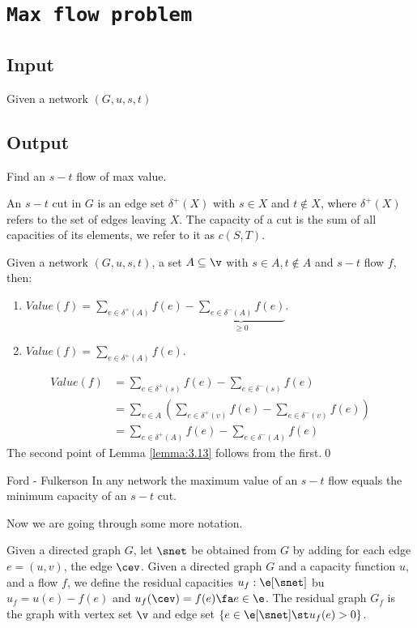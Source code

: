 \section{\texttt{Max flow problem}}
\subsection{Input}
Given a network $(G, u, s, t)$
\subsection{Output}
Find an $s - t$ flow of max value.

An $s - t$ cut in $G$ is an edge set $\delta^+(X)$ with $s \in X$ and $t \notin X$, where $\delta^+(X)$ refers to the set of edges leaving $X$. The capacity of a cut is the sum of all capacities of its elements, we refer to it as $c(S, T)$.
\begin{customlemma}{3.13}
\label{lemma:3.13}
    Given a network $(G, u, s, t)$, a set $A \subseteq \v$ with $s \in A, t \notin A$ and $s - t$ flow $f$, then:
    \begin{enumerate}
        \item\label{lemma:3.13_1} $Value(f) = \sum_{e \in \delta^+(A)}f(e) - \underbrace{\sum_{e \in \delta^-(A)}f(e)}_{\geq 0}$.
        \item\label{lemma:3.13_2} $Value(f) = \sum_{e \in \delta^+(A)}f(e)$.
    \end{enumerate}
\end{customlemma}
\begin{prf}
    \begin{align*}
        Value(f) &= \sum_{e \in \delta^+(s)}f(e) - \sum_{e \in \delta^-(s)}f(e)\\
        &=\sum_{v \in A}(\sum_{e \in \delta^+(v)}f(e) - \sum_{e \in \delta^-(v)}f(e))\\
        &=\sum_{e \in \delta^+(A)}f(e) - \sum_{e \in \delta^-(A)}f(e)
    \end{align*}
    The second point of Lemma \ref{lemma:3.13} follows from the first.\qed
\end{prf}
\begin{customtheorem}{Ford - Fulkerson}
\label{theorem:ford-fulkerson}
    In any network the maximum value of an $s - t$ flow equals the minimum capacity of an $s - t$ cut.
\end{customtheorem}
Now we are going through some more notation.

Given a directed graph $G$, let $\snet$ be obtained from $G$ by adding for each edge $e = (u, v)$, the edge $\cev$. Given a directed graph $G$ and a capacity function $u$, and a flow $f$, we define the residual capacities $u_f: \e[\snet]$ bu $u_f = u(e) - f(e)$ and $u_f(\cev) = f(e) \fa e \in \e$. The residual graph $G_f$ is the graph with vertex set $\v$ and edge set $\{e \in \e[\snet]\st u_f(e) > 0\}$.

